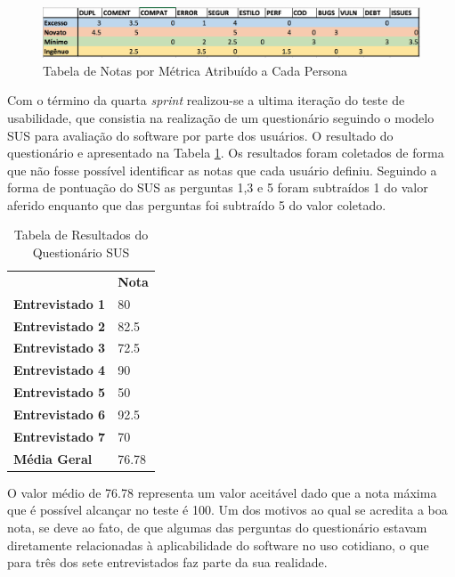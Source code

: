 \graphicspath{{figuras/}}
\begin{figure}[h]
\centering
\includegraphics[scale=0.60]{tabela_de_usuarios.png}
\caption{Tabela de Notas por Métrica Atribuído a Cada Persona}
\label{img:tabela_notas}
\end{figure}

Com o término da quarta \textit{sprint} realizou-se a ultima iteração do teste de usabilidade, que consistia na realização de um questionário seguindo o modelo SUS para avaliação do software por parte dos usuários. O resultado do questionário e apresentado na Tabela \ref{tbl:questionario}. Os resultados foram coletados de forma que não fosse possível identificar as notas que cada usuário definiu. Seguindo a forma de pontuação do SUS as perguntas 1,3 e 5 foram subtraídos 1 do valor aferido enquanto que das perguntas foi subtraído 5 do valor coletado. 

\begin{table}[h!]
\centering
\caption{Tabela de Resultados do Questionário SUS}
\label{tbl:questionario}
\begin{tabular}{ll}
\textbf{}               & \textbf{Nota} \\
\textbf{Entrevistado 1} & 80          \\
\textbf{Entrevistado 2} & 82.5            \\
\textbf{Entrevistado 3} & 72.5            \\
\textbf{Entrevistado 4} & 90          \\
\textbf{Entrevistado 5} & 50          \\
\textbf{Entrevistado 6} & 92.5            \\
\textbf{Entrevistado 7} & 70          \\
\rowcolor[HTML]{34CDF9} 
\textbf{Média Geral}    & 76.78        
\end{tabular}
\end{table}

O valor médio de 76.78 representa um valor aceitável dado que a nota máxima que é possível alcançar no teste é 100. Um dos motivos ao qual se acredita a boa nota, se deve ao fato, de que algumas das perguntas do questionário estavam diretamente relacionadas à aplicabilidade do software no uso cotidiano, o que para três dos sete entrevistados faz parte da sua realidade.



